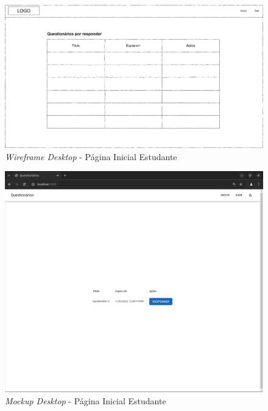 \documentclass[12pt,a4paper,final]{article}
\begin{document}
    \begin{figure}[H]
        \centering
        \includegraphics[width=\textwidth,height=0.9\textheight,keepaspectratio]{wireframes/questionarios.wireframes-estudante-geral-desktop.drawio}
        \caption{\textit{Wireframe Desktop} - Página Inicial Estudante}
        \label{fig:wd-pie}
    \end{figure}

    \begin{figure}[H]
        \centering
        \includegraphics[width=\textwidth,height=0.9\textheight,keepaspectratio]{mockups/questionarios.wireframes-estudante-geral-desktop}
        \caption{\textit{Mockup Desktop} - Página Inicial Estudante}
        \label{fig:md-pie}
    \end{figure}
\end{document}
